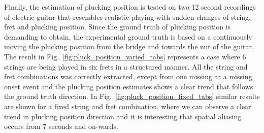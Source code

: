 \documentclass{article}
\begin{document}
Finally, the estimation of plucking position is tested on two 12 second recordings of electric guitar that resembles realistic playing with sudden changes of string, fret and plucking position. Since the ground truth of plucking position is demanding to obtain, the experimental ground truth is based on a continuously moving the plucking position from the bridge and towards the nut of the guitar. The result in Fig.~\ref{fig:pluck_position_varied_tabs} represents a case where 6 strings are being played in six frets in a structured manner. All the string and fret combinations was correctly extracted, except from one missing at a missing onset event and the plucking position estimates shows a clear trend that follows the ground truth direction. In Fig.~\ref{fig:pluck_position_fixed_tabs} similar results are shown for a fixed string and fret combination, where we can observe a clear trend in plucking position direction and it is interesting that spatial aliasing occurs from 7 seconds and on-wards. %
%
%
%
%
%
%
\end{document}
